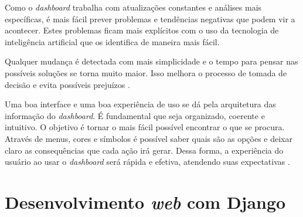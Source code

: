 \indent
\par Como o \textit{dashboard} trabalha com atualizações constantes e análises mais específicas, é mais fácil prever problemas e tendências negativas que podem vir a acontecer. Estes problemas ficam mais explícitos com o uso da tecnologia de inteligência artificial que os identifica de maneira mais fácil.

\par Qualquer mudança é detectada com mais simplicidade e o tempo para pensar nas possíveis soluções se torna muito maior. Isso melhora o processo de tomada de decisão e evita possíveis prejuízos \cite{Systemsat}.

\indent
\par Uma boa interface e uma boa experiência de uso se dá pela arquitetura das informação do \textit{dashboard}. É fundamental que seja organizado, coerente e intuitivo. O objetivo é tornar o mais fácil possível encontrar o que se procura. Através de menus, cores e  símbolos é possível saber quais são as opções e deixar claro as consequências que cada ação irá gerar. Dessa forma, a experiência do usuário ao usar o \textit{dashboard} será rápida e efetiva, atendendo suas expectativas \cite{Hostinger}.

\section{Desenvolvimento \textit{web} com Django}

